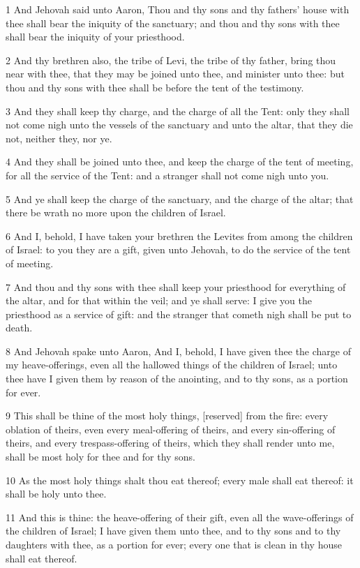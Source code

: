 \par 1 And Jehovah said unto Aaron, Thou and thy sons and thy fathers' house with thee shall bear the iniquity of the sanctuary; and thou and thy sons with thee shall bear the iniquity of your priesthood.
\par 2 And thy brethren also, the tribe of Levi, the tribe of thy father, bring thou near with thee, that they may be joined unto thee, and minister unto thee: but thou and thy sons with thee shall be before the tent of the testimony.
\par 3 And they shall keep thy charge, and the charge of all the Tent: only they shall not come nigh unto the vessels of the sanctuary and unto the altar, that they die not, neither they, nor ye.
\par 4 And they shall be joined unto thee, and keep the charge of the tent of meeting, for all the service of the Tent: and a stranger shall not come nigh unto you.
\par 5 And ye shall keep the charge of the sanctuary, and the charge of the altar; that there be wrath no more upon the children of Israel.
\par 6 And I, behold, I have taken your brethren the Levites from among the children of Israel: to you they are a gift, given unto Jehovah, to do the service of the tent of meeting.
\par 7 And thou and thy sons with thee shall keep your priesthood for everything of the altar, and for that within the veil; and ye shall serve: I give you the priesthood as a service of gift: and the stranger that cometh nigh shall be put to death.
\par 8 And Jehovah spake unto Aaron, And I, behold, I have given thee the charge of my heave-offerings, even all the hallowed things of the children of Israel; unto thee have I given them by reason of the anointing, and to thy sons, as a portion for ever.
\par 9 This shall be thine of the most holy things, [reserved] from the fire: every oblation of theirs, even every meal-offering of theirs, and every sin-offering of theirs, and every trespass-offering of theirs, which they shall render unto me, shall be most holy for thee and for thy sons.
\par 10 As the most holy things shalt thou eat thereof; every male shall eat thereof: it shall be holy unto thee.
\par 11 And this is thine: the heave-offering of their gift, even all the wave-offerings of the children of Israel; I have given them unto thee, and to thy sons and to thy daughters with thee, as a portion for ever; every one that is clean in thy house shall eat thereof.
